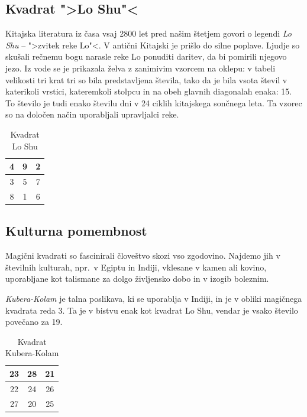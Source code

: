 \documentclass[a4paper,12pt]{article}
\theoremstyle{definition}
\theoremstyle{plain}
\newcommand{\pojem}[1]{\emph{\color{purple}#1}}
\begin{document}
\subsection{Kvadrat ">Lo Shu"<}

Kitajska literatura iz časa vsaj 2800 let pred našim štetjem govori o legendi
\pojem{Lo Shu} -- ">zvitek reke Lo"<. V antični Kitajski je prišlo do
silne poplave. Ljudje so skušali rečnemu bogu narasle reke Lo ponuditi daritev,
da bi pomirili njegovo jezo. Iz vode se je prikazala želva z zanimivim vzorcem
na oklepu: v tabeli velikosti tri krat tri so bila predstavljena števila, tako
da je bila vsota števil v katerikoli vrstici, kateremkoli stolpcu in na obeh
glavnih diagonalah enaka: 15. To število je tudi enako številu dni v 24 ciklih
kitajskega sončnega leta. Ta vzorec so na določen način uporabljali upravljalci
reke.

\begin{table}[h!]
\centering
\caption{Kvadrat Lo Shu}
\label{table:loshu}
\begin{tabular}{ccc}\toprule
    4 & 9 & 2 \\ \midrule
   3 & 5 & 7 \\ \midrule
   8 & 1 & 6 \\ \bottomrule
\end{tabular}
\end{table}

\newpage
\subsection{Kulturna pomembnost}

Magični kvadrati so fascinirali človeštvo skozi vso zgodovino. Najdemo jih
v številnih kulturah, npr.\ v Egiptu in Indiji, vklesane v kamen ali
kovino, uporabljane kot talismane za dolgo življensko dobo in v
izogib boleznim.

\pojem{Kubera-Kolam} je talna poslikava, ki se uporablja v Indiji, in je v
obliki magičnega kvadrata reda 3. Ta je v bistvu enak kot kvadrat
Lo Shu, vendar je vsako število povečano za 19.

\begin{table}[h!]
\centering
\caption{Kvadrat Kubera-Kolam}
\label{table:kubera}
\begin{tabular}{ccc}\toprule
   23 & 28 & 21 \\ \midrule
   22 & 24 & 26 \\ \midrule
   27 & 20 & 25 \\ \bottomrule
\end{tabular}
\end{table}
\end{document}
